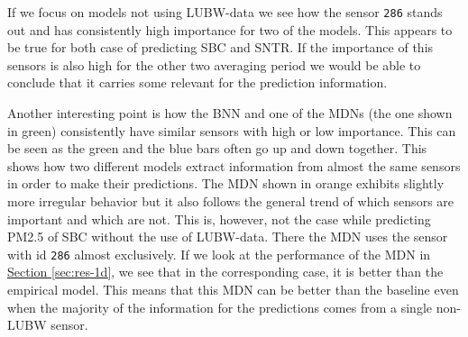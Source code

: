 \documentclass[12pt,a4paper,twoside]{scrartcl}
\numberwithin{equation}{section}
\newcommand{\refsec}[1]{\hyperref[#1]{Section \ref*{#1}}}
\begin{document}
If we focus on models not using LUBW-data we see how the sensor \texttt{286} stands out and has consistently high importance for two of the models. This appears to be true for both case of predicting SBC and SNTR. If the importance of this sensors is also high for the other two averaging period we would be able to conclude that it carries some relevant for the prediction information.

Another interesting point is how the BNN and one of the MDNs (the one shown in green) consistently have similar sensors with high or low importance. This can be seen as the green and the blue bars often go up and down together. This shows how two different models extract information from almost the same sensors in order to make their predictions. The MDN shown in orange exhibits slightly more irregular behavior but it also follows the general trend of which sensors are important and which are not. This is, however, not the case while predicting PM2.5 of SBC without the use of LUBW-data. There the MDN uses the sensor with id \texttt{286} almost exclusively. If we look at the performance of the MDN in \refsec{sec:res-1d}, we see that in the corresponding case, it is better than the empirical model. This means that this MDN can be better than the baseline even when the majority of the information for the predictions comes from a single non-LUBW sensor.
\end{document}
